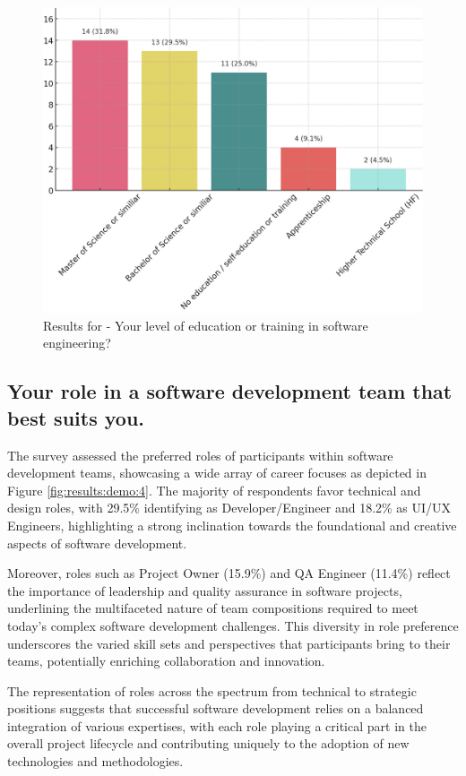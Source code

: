 \begin{figure}[h!]
\centering
\includegraphics[width=\linewidth]{Images/Survey/demo_3.png}
\caption{Results for - Your level of education or training in software engineering?}
\label{fig:results:demo:3}
\end{figure}

\pagebreak

\subsection*{Your role in a software development team that best suits you.}
The survey assessed the preferred roles of participants within software development teams, showcasing a wide array of career focuses as depicted in Figure \ref{fig:results:demo:4}. The majority of respondents favor technical and design roles, with 29.5\% identifying as Developer/Engineer and 18.2\% as UI/UX Engineers, highlighting a strong inclination towards the foundational and creative aspects of software development.

Moreover, roles such as Project Owner (15.9\%) and QA Engineer (11.4\%) reflect the importance of leadership and quality assurance in software projects, underlining the multifaceted nature of team compositions required to meet today’s complex software development challenges. This diversity in role preference underscores the varied skill sets and perspectives that participants bring to their teams, potentially enriching collaboration and innovation.

The representation of roles across the spectrum from technical to strategic positions suggests that successful software development relies on a balanced integration of various expertises, with each role playing a critical part in the overall project lifecycle and contributing uniquely to the adoption of new technologies and methodologies.


